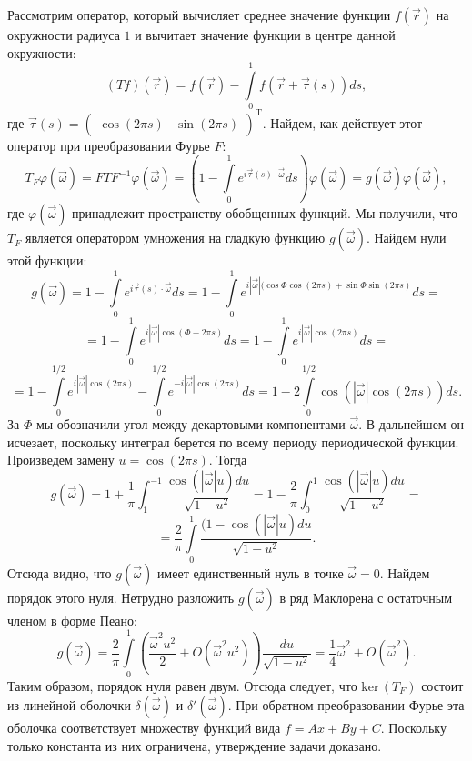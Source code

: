 \documentclass{article}
\begin{document}
Рассмотрим оператор, который вычисляет среднее значение функции $f(\vec{r})$ на окружности радиуса $1$ и вычитает значение функции в центре данной окружности:
$$(Tf) (\vec{r}) = f(\vec{r}) - \int\limits_{0}^{1} f(\vec{r} + \vec{\tau} (s)) ds,$$
где $\vec{\tau} (s) = (\begin{array}{cc} \cos (2\pi s) & \sin (2\pi s) \end{array})^\mathrm{T}$.
Найдем, как действует этот оператор при преобразовании Фурье $F$:
$$T_{F} \varphi (\vec{\omega}) = F T F^{-1} \varphi (\vec{\omega}) = \left(1 - \int\limits_{0}^{1} e^{i \vec{\tau} (s) \cdot \vec{\omega}} ds \right) \varphi (\vec{\omega}) = g(\vec{\omega}) \varphi (\vec{\omega}),$$
где $\varphi (\vec{\omega})$ принадлежит пространству обобщенных функций. Мы получили, что $T_F$ является оператором умножения на гладкую функцию $g(\vec{\omega})$. Найдем нули этой функции:
$$g(\vec{\omega}) =  1 - \int\limits_{0}^{1} e^{i \vec{\tau} (s) \cdot \vec{\omega}} ds = 1 - \int\limits_{0}^{1} e^{i |\vec{\omega}| (\cos \Phi \cos (2\pi s) +\sin \Phi  \sin (2\pi s)}ds = $$
$$ = 1 - \int\limits_{0}^{1} e^{i |\vec{\omega}| \cos (\Phi - 2\pi s)}ds = 1 - \int\limits_{0}^{1} e^{i |\vec{\omega}| \cos (2\pi s)}ds = $$
$$ = 1 - \int\limits_{0}^{1/2} e^{i |\vec{\omega}| \cos (2\pi s)} - \int\limits_{0}^{1/2} e^{-i |\vec{\omega}| \cos (2\pi s)}ds = 1 - 2 \int\limits_{0}^{1/2} \cos(|\vec{\omega}| \cos (2\pi s))ds.$$
За $\Phi$ мы обозначили угол между декартовыми компонентами $\vec{\omega}$. В дальнейшем он исчезает, поскольку интеграл берется по всему периоду периодической функции. Произведем замену $u = \cos (2\pi s)$. Тогда
$$g(\vec{\omega}) = 1 + \frac{1}{\pi} \int_{1}^{-1} \frac{\cos(|\vec{\omega}| u) du}{\sqrt{1 - u^2}} = 1 - \frac{2}{\pi} \int_{0}^{1} \frac{\cos(|\vec{\omega}| u) du}{\sqrt{1 - u^2}} = $$
$$ = \frac{2}{\pi} \int\limits_0^1 \frac{(1 - \cos(|\vec{\omega}| u) du}{\sqrt{1 - u^2}}.$$
Отсюда видно, что $g(\vec{\omega})$ имеет единственный нуль в точке $\vec{\omega} = 0$. Найдем порядок этого нуля. Нетрудно разложить $g(\vec{\omega})$ в ряд Маклорена с остаточным членом в форме Пеано:
$$g(\vec{\omega}) = \frac{2}{\pi} \int\limits_0^1 \left(\frac{\vec{\omega}^2u^2}{2} + O(\vec{\omega}^2u^2) \right) \frac{du}{\sqrt{1 - u^2}} = \frac14 \vec{\omega}^2 + O(\vec{\omega}^2).$$
Таким образом, порядок нуля равен двум. Отсюда следует, что $\text{ker}\, (T_F)$ состоит из линейной оболочки $\delta(\vec{\omega})$ и $\delta'(\vec{\omega})$. При обратном преобразовании Фурье эта оболочка соответствует множеству функций вида $f = Ax + By + C$. Поскольку только константа из них ограничена, утверждение задачи доказано.
\end{document}
